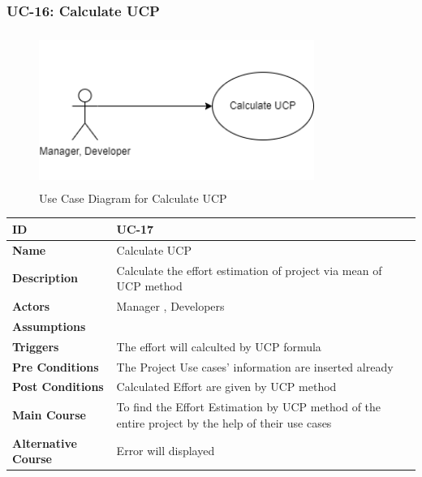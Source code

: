     \subsubsection{UC-16: Calculate UCP}
    \begin{figure}[H]
        \includegraphics[height=5cm, width=0.8\textwidth]{./diagrams/Use Case/u16.png}
        \centering 
        \caption{Use Case Diagram for Calculate UCP}
        \label{fig:Usecase1}
        \end{figure}
        
    \begin{center}
        \begin{tabularx}{\textwidth}{|l|X|}
            \hline
            \textbf{ID} & UC-17 \\
            \hline
            \textbf{Name} & Calculate UCP \\
            \hline
            \textbf{Description} & Calculate the effort estimation of project via mean of UCP method \\
            \hline
            \textbf{Actors} & Manager , Developers \\
            \hline
            \textbf{Assumptions} &  \\
            \hline
            \textbf{Triggers} & The effort will calculted by UCP formula \\
            \hline
            \textbf{Pre Conditions} & The Project Use cases' information are inserted already \\
            \hline
            \textbf{Post Conditions} & Calculated Effort are given by UCP method  \\
            \hline
            \textbf{Main Course} & To find the Effort Estimation by UCP method of the entire project by the help of their use cases \\
            \hline
            \textbf{Alternative Course} & Error will displayed \\
            \hline
            
        \end{tabularx}
    \end{center}
    
